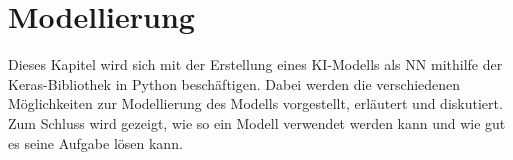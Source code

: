 \chapter{Modellierung}
\label{chap:Modellierung}
Dieses Kapitel wird sich mit der Erstellung eines \ac{KI}-Modells als \ac{NN} mithilfe der Keras-Bibliothek in Python beschäftigen. Dabei werden die verschiedenen Möglichkeiten
zur Modellierung des Modells vorgestellt, erläutert und diskutiert. Zum Schluss wird gezeigt, wie so ein Modell verwendet werden kann und wie gut es seine Aufgabe lösen kann.







